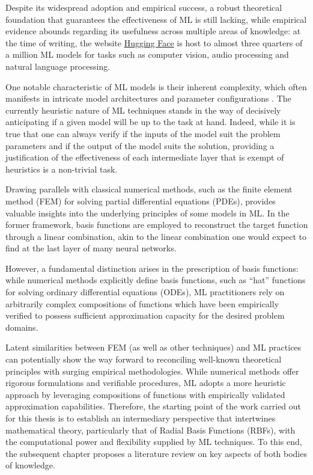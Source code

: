 \documentclass[12pt]{report} %
\begin{document}
Despite its widespread adoption and empirical success, a robust theoretical foundation that guarantees the effectiveness of ML is still lacking, while empirical evidence abounds regarding its usefulness across multiple areas of knowledge: at the time of writing, the website \href{https://huggingface.co/}{Hugging Face} is host to almost three quarters of a million ML models for tasks such as computer vision, audio processing and natural language processing.

One notable characteristic of ML models is their inherent complexity, which often manifests
in intricate model architectures and parameter configurations \cite{cuomo2022scientific}.
The currently heuristic nature of ML techniques stands in the way of decisively
anticipating if a given model will be up to the task at hand.
Indeed, while it is true that one can always verify if the inputs of
the model suit the problem parameters and if the output of the model suits the solution,
providing a justification of the effectiveness of each intermediate layer that is
exempt of heuristics is a non-trivial task.

Drawing parallels with classical numerical methods, such as the finite element method (FEM) for
solving partial differential equations (PDEs), provides valuable insights into the underlying
principles of some models in ML. In the former framework,
basis functions are employed to
reconstruct the target function through a linear combination, akin to the linear combination
one would expect to find at the last layer of many neural networks.

However, a fundamental distinction arises in the prescription of basis functions: while numerical methods explicitly define basis functions, such as ``hat'' functions for solving ordinary differential equations (ODEs), ML practitioners rely on arbitrarily complex compositions of functions which have been empirically verified to possess sufficient approximation capacity for the desired problem domains.

Latent similarities between FEM (as well as other techniques) and ML practices
can potentially show the way forward to reconciling well-known theoretical principles with
surging empirical methodologies. While numerical
methods offer rigorous formulations and verifiable procedures, ML adopts a more heuristic
approach by leveraging compositions of functions with empirically validated approximation
capabilities. Therefore, the starting point of the work carried out for this thesis is to establish an intermediary perspective that intertwines mathematical theory, particularly that of Radial Basis Functions (RBFs), with the computational power and flexibility supplied by ML techniques. To this end, the subsequent chapter proposes a literature review on key aspects of both bodies of knowledge.
\end{document}
